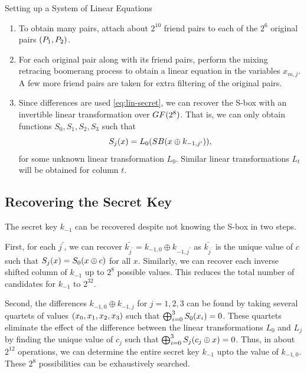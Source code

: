 \documentclass[notheorems]{beamer}
\theoremstyle{definition}
\theoremstyle{example}
\begin{document}
    \begin{frame}[<+->]{Setting up a System of Linear Equations}
        \begin{enumerate}
            \conti
            \item To obtain many pairs, attach about \(2^{10}\) friend pairs to
            each of the \(2^6\) original pairs \((P_1, P_2)\).
            \item For each original pair along with its friend pairs, perform
            the mixing retracing boomerang process to obtain a linear equation
            in the variables \(x_{m, j}\). A few more friend pairs are taken for
            extra filtering of the original pairs.
            \item Since differences are used \eqref{eq:lin-secret}, we can
            recover the S-box with an invertible linear transformation over
            \(GF(2^8)\). That is, we can only obtain functions \(S_0, S_1,
            S_2, S_3\) such that
            \begin{equation}
                S_j(x) = L_0(SB(x \oplus k_{-1, j^\prime})),
            \end{equation}
            for some unknown linear transformation \(L_0\). Similar linear
            transformations \(L_t\) will be obtained for column \(t\).
        \end{enumerate}    
    \end{frame}

    \subsection{Recovering the Secret Key}

    The secret key \(k_{-1}\) can be recovered despite not knowing the S-box in two
    steps.

    First, for each \(j^\prime\), we can recover \(\bar{k_{j^\prime}} = k_{-1, 0}
    \oplus k_{-1, {j^\prime}}\) as \(\bar{k_{j^\prime}}\) is the unique value of
    \(c\) such that \(S_j(x) = S_0(x \oplus c)\) for all \(x\). Similarly,
    we can recover each inverse shifted column of \(k_{-1}\) up to \(2^8\) possible
    values. This reduces the total number of candidates for \(k_{-1}\) to
    \(2^{32}\).

    Second, the differences \(k_{-1, 0} \oplus k_{-1, j}\) for \(j = 1, 2, 3\) can
    be found by taking several quartets of values \((x_0, x_1, x_2, x_3)\) such
    that \(\bigoplus_{i=0}^3S_0(x_i) = 0\). These quartets eliminate the effect
    of the difference between the linear transformations \(L_0\) and \(L_j\) by
    finding the unique value of \(c_j\) such that \(\bigoplus_{i=0}^3 S_j(c_j
    \oplus x) = 0\). Thus, in about \(2^{12}\) operations, we can determine the
    entire secret key \(k_{-1}\) upto the value of \(k_{-1, 0}\). These \(2^8\)
    possibilities can be exhaustively searched.
\end{document}
